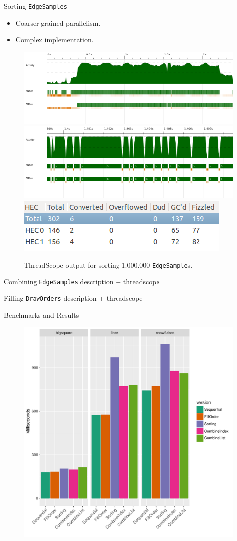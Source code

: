 \documentclass[slidestop,compress,mathserif, xcolor=table]{beamer}
\begin{document}
\begin{frame}[c]{Sorting \texttt{EdgeSamples}}
  \begin{itemize}
  \item Coarser grained parallelism.
  \item Complex implementation.
  \end{itemize}
 \begin{figure}[h!]
  \centering
  \includegraphics[width=0.7\linewidth,trim={0cm 2cm 0 0},clip]{../threadscope/sorting/sorting-final}\\
  \includegraphics[width=0.3\linewidth,trim={4cm 3cm 5cm 0},clip]{../threadscope/sorting/sorting-final-zoom}
  \includegraphics[width=0.4\linewidth,trim={0 0 0 1cm}]{../threadscope/sorting/sorting-final-sparks}
  \caption{ThreadScope output for sorting 1.000.000 \texttt{EdgeSample}s.}
  \label{fig:sorting-thread}
\end{figure}

\end{frame}

\begin{frame}[c]{Combining \texttt{EdgeSamples}}
description + threadscope
\end{frame}

\begin{frame}[c]{Filling \texttt{DrawOrders}}
description + threadscope
\end{frame}

\begin{frame}[c]{Benchmarks and Results}
  \begin{figure}[h!]
    \centering
    \includegraphics[width=0.6\linewidth,trim={0cm 0.5cm 0 0},clip]{../timings}
\end{figure}
\end{frame}
\end{document}
